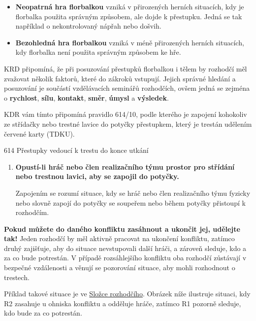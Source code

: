 \documentclass{newsletter_2025}
\begin{document}
\begin{itemize}
	\item \textbf{Neopatrná hra florbalkou} vzniká v přirozených herních situacích, kdy je florbalka použita správným způsobem, ale dojde k přestupku. Jedná se tak například o nekontrolovaný nápřah nebo došvih.
	\item \textbf{Bezohledná hra florbalkou} vzniká v méně přirozených herních situacích, kdy florbalka není použita správným způsobem ke hře.
\end{itemize}

KRD připomíná, že při posuzování přestupků florbalkou i tělem by rozhodčí měl zvažovat několik faktorů, které do zákroků vstupují. Jejich správné hledání a posuzování je součástí vzdělávacích seminářů rozhodčích, ovšem jedná se zejména o \textbf{rychlost}, \textbf{sílu}, \textbf{kontakt}, \textbf{směr}, \textbf{úmysl} a \textbf{výsledek}.

\clearpage
{}
KDR vám tímto připomíná pravidlo 614/10, podle kterého je zapojení kohokoliv ze střídačky nebo trestné lavice do potyčky přestupkem, který je trestán udělením červené karty (TDKU).

\begin{admonition-quote}{614 Přestupky vedoucí k trestu do konce utkání}
	\begin{enumerate}\addtocounter{enumi}{9}
		\item \textbf{Opustí-li hráč nebo člen realizačního týmu prostor pro střídání nebo trestnou lavici, aby se zapojil do potyčky.}
		
		\begin{flushleft}
			Zapojením se rozumí situace, kdy se hráč nebo člen realizačního týmu fyzicky nebo slovně zapojí do potyčky se
			soupeřem nebo během potyčky přistoupí k rozhodčím.
		\end{flushleft}
	\end{enumerate}
\end{admonition-quote}

\textbf{Pokud můžete do daného konfliktu zasáhnout a ukončit jej, udělejte tak!} Jeden rozhodčí by měl aktivně pracovat na ukončení konfliktu, zatímco druhý zajišťuje, aby do situace nevstupovali další hráči, a zároveň sleduje, kdo a za co bude potrestán. V případě rozsáhlejšího konfliktu oba rozhodčí zůstávají v bezpečné vzdálenosti a věnují se pozorování situace, aby mohli rozhodnout o trestech. 

Příklad takové situace je ve \href{https://www.ceskyflorbal.cz/data/document/20240902/171344_86ae_Slozka-rozhodciho.pdf}{Složce rozhodčího}. Obrázek níže ilustruje situaci, kdy R2 zasahuje u ohniska konfliktu a odděluje hráče, zatímco R1 pozorně sleduje, kdo bude za co potrestán.
\end{document}
